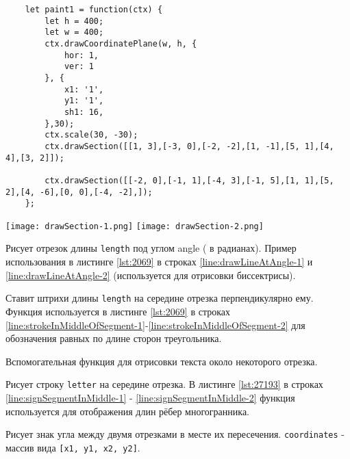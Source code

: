 \begin{lstlisting}
    let paint1 = function(ctx) {
        let h = 400;
        let w = 400;
        ctx.drawCoordinatePlane(w, h, {
            hor: 1,
            ver: 1
        }, {
            x1: '1',
            y1: '1',
            sh1: 16,
        },30);
        ctx.scale(30, -30);
        ctx.drawSection([[1, 3],[-3, 0],[-2, -2],[1, -1],[5, 1],[4, 4],[3, 2]]);

        ctx.drawSection([[-2, 0],[-1, 1],[-4, 3],[-1, 5],[1, 1],[5, 2],[4, -6],[0, 0],[-4, -2],]);
    };
    \end{lstlisting}
    \texttt{[image: drawSection-1.png]}
    \texttt{[image: drawSection-2.png]}

Рисует отрезок длины \texttt{length} под углом angle ( в радианах). Пример использования в листинге \ref{lst:2069} в строках \ref{line:drawLineAtAngle-1} и \ref{line:drawLineAtAngle-2} (используется для отрисовки биссектрисы). 

Ставит штрихи длины \texttt{length} на середине отрезка перпендикулярно ему. Функция используется в листинге \ref{lst:2069} в строках \ref{line:strokeInMiddleOfSegment-1}-\ref{line:strokeInMiddleOfSegment-2} для обозначения равных по длине сторон треугольника.

Вспомогательная функция для отрисовки текста около некоторого отрезка.

Рисует строку \texttt{letter} на середине отрезка. В листинге \ref{lst:27193} в строках \ref{line:signSegmentInMiddle-1} - \ref{line:signSegmentInMiddle-2} функция используется для отображения длин рёбер многогранника.

Рисует знак угла между двумя отрезками в месте их пересечения. \texttt{coordinates} - массив вида \texttt{[x1, y1, x2, y2]}.


